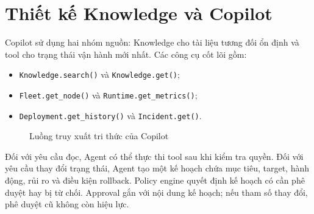 \section{Thiết kế Knowledge và Copilot}

Copilot sử dụng hai nhóm nguồn: Knowledge cho tài liệu tương đối ổn định và tool
cho trạng thái vận hành mới nhất. Các công cụ cốt lõi gồm:
\begin{itemize}
  \item \texttt{Knowledge.search()} và \texttt{Knowledge.get()};
  \item \texttt{Fleet.get\_node()} và \texttt{Runtime.get\_metrics()};
  \item \texttt{Deployment.get\_history()} và \texttt{Incident.get()}.
\end{itemize}

\begin{figure}[H]
\centering
{}
\caption{Luồng truy xuất tri thức của Copilot}
\label{fig:copilot-retrieval-flow}
\end{figure}

Đối với yêu cầu đọc, Agent có thể thực thi tool sau khi kiểm tra quyền. Đối với
yêu cầu thay đổi trạng thái, Agent tạo một kế hoạch chứa mục tiêu, target, hành
động, rủi ro và điều kiện rollback. Policy engine quyết định kế hoạch có cần phê
duyệt hay bị từ chối. Approval gắn với nội dung kế hoạch; nếu tham số thay đổi,
phê duyệt cũ không còn hiệu lực.